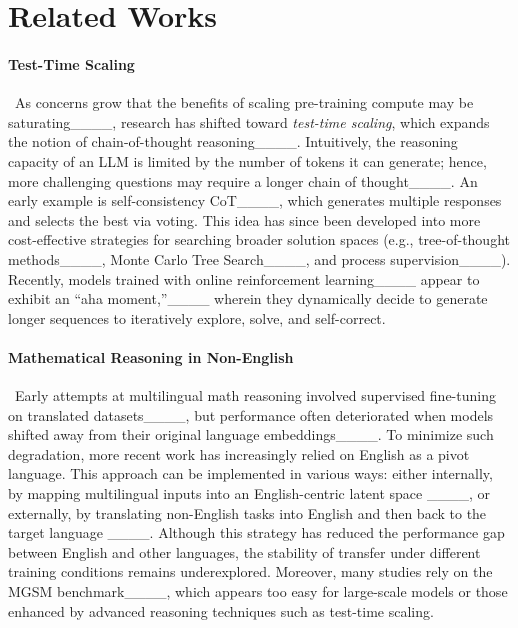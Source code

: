 \section{Related Works}
\paragraph{Test-Time Scaling}~As concerns grow that the benefits of scaling pre-training compute may be saturating____, research has shifted toward \emph{test-time scaling}, which expands the notion of chain-of-thought reasoning____. Intuitively, the reasoning capacity of an LLM is limited by the number of tokens it can generate; hence, more challenging questions may require a longer chain of thought____. An early example is self-consistency CoT____, which generates multiple responses and selects the best via voting. This idea has since been developed into more cost-effective strategies for searching broader solution spaces (e.g., tree-of-thought methods____, Monte Carlo Tree Search____, and process supervision____). Recently, models trained with online reinforcement learning____ appear to exhibit an ``aha moment,''____ wherein they dynamically decide to generate longer sequences to iteratively explore, solve, and self-correct. 


\paragraph{Mathematical Reasoning in Non-English}~Early attempts at multilingual math reasoning involved supervised fine-tuning on translated datasets____, but performance often deteriorated when models shifted away from their original language embeddings____. To minimize such degradation, more recent work has increasingly relied on English as a pivot language. This approach can be implemented in various ways: either internally, by mapping multilingual inputs into an English-centric latent space ____, or externally, by translating non-English tasks into English and then back to the target language ____. Although this strategy has reduced the performance gap between English and other languages, the stability of transfer under different training conditions remains underexplored. Moreover, many studies rely on the MGSM benchmark____, which appears too easy for large-scale models or those enhanced by advanced reasoning techniques such as test-time scaling.